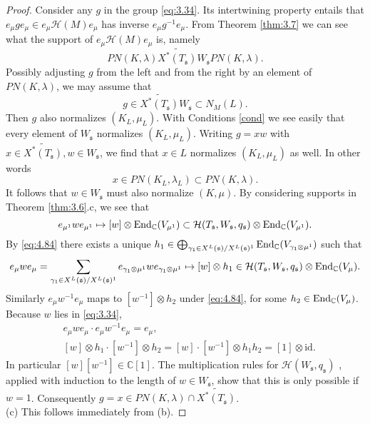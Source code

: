 \documentclass[11pt]{amsart}
\theoremstyle{definition}
\begin{document}
\begin{proof}
Consider any $g$ in the group \eqref{eq:3.34}. Its intertwining property entails that 
$e_{\mu } g e_{\mu } \in e_{\mu } {{\mathcal H}} (M) e_{\mu }$
has inverse $e_{\mu } g^{-1} e_{\mu }$. From Theorem \ref{thm:3.7} we
can see what the support of $e_{\mu } {{\mathcal H}} (M) e_{\mu }$ is, namely
\[
PN (K,\lambda) \widetilde{X^* (T_{{\mathfrak s}})} W_{{\mathfrak s}} PN (K,\lambda) .
\] 
Possibly adjusting $g$ from the left and from the right by an element of 
$PN (K,\lambda)$, we may assume that 
\[
g \in \widetilde{X^* (T_{{\mathfrak s}})} W_{{\mathfrak s}} \subset N_M (L) .
\]
Then $g$ also normalizes $(K_L,\mu_L )$. With Conditions \ref{cond} we see easily 
that every element of $W_{{\mathfrak s}}$ normalizes $(K_L,\mu_L )$. Writing $g = x w$ with
$x \in \widetilde{X^* (T_{{\mathfrak s}})}, w \in W_{{\mathfrak s}}$, we find that $x \in L$ normalizes
$(K_L,\mu_L )$ as well. In other words 
\[
x \in PN (K_L,\lambda_L) \subset PN (K,\lambda) .
\]
It follows that $w \in W_{{\mathfrak s}}$ must also normalize $(K,\mu )$.
By considering supports in Theorem \ref{thm:3.6}.c, we see that
\[
e_{\mu^1} w e_{\mu^1} \mapsto [w] \otimes {{\rm End}}_{\mathbb C} (V_{\mu^1}) \subset
{{\mathcal H}} (T_{{\mathfrak s}},W_{{\mathfrak s}},q_{{\mathfrak s}}) \otimes {{\rm End}}_{\mathbb C} (V_{\mu^1}) .
\]
By \eqref{eq:4.84} there exists a unique $h_1 \in \bigoplus_{\gamma_1 \in X^L ({{\mathfrak s}}) 
/ X^L ({{\mathfrak s}})^1} {{\rm End}}_{\mathbb C} (V_{\gamma_1 \otimes \mu^1})$ such that
\[
e_\mu w e_\mu = \sum_{\gamma_1 \in X^L ({{\mathfrak s}}) / X^L ({{\mathfrak s}})^1} e_{\gamma_1 \otimes \mu^1}
w e_{\gamma_1 \otimes \mu^1} \mapsto [w] \otimes h_1 \in 
{{\mathcal H}} (T_{{\mathfrak s}},W_{{\mathfrak s}},q_{{\mathfrak s}}) \otimes {{\rm End}}_{\mathbb C} (V_\mu) .
\]
Similarly $e_\mu w^{-1} e_\mu$ maps to $[w^{-1}] \otimes h_2$ under \eqref{eq:4.84},
for some $h_2 \in {{\rm End}}_{\mathbb C} (V_{\mu })$. Because $w$ lies in \eqref{eq:3.34},
\begin{align*}
& e_{\mu } w e_{\mu } \cdot e_{\mu } w^{-1} e_{\mu } = e_{\mu } , \\
& [w] \otimes h_1 \cdot [w^{-1}] \otimes h_2 = [w] \cdot [w^{-1}] \otimes h_1 h_2 = 
[1] \otimes \text{id} .
\end{align*}
In particular $[w] [w^{-1}] \in {\mathbb C} [1]$. The multiplication rules for ${{\mathcal H}} (W_{{\mathfrak s}},q_{{\mathfrak s}})$ 
\cite[2.5.3]{Sec3}, applied with induction to the length of $w \in W_{{\mathfrak s}}$,
show that this is only possible if $w = 1$. Consequently $g = x \in PN (K,\lambda) \cap
\widetilde{X^* (T_{{\mathfrak s}})}$.\\
(c) This follows immediately from (b). 
\end{proof}
\end{document}
